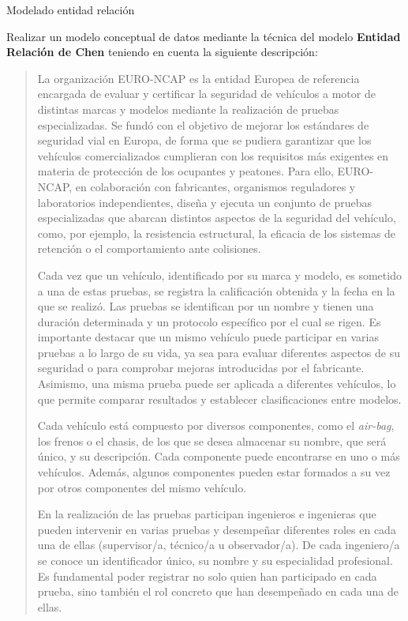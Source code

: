 \documentclass[10pt,a4paper,addpoints,answers]{exam}
\begin{document}
\begin{questions}

\question[2\half] Modelado entidad relación

Realizar un modelo conceptual de datos mediante la técnica del modelo \textbf{Entidad Relación de Chen} teniendo en cuenta la siguiente descripción:

\begin{quotation}
La organización EURO-NCAP es la entidad Europea de referencia encargada de evaluar y certificar la seguridad de vehículos a motor de distintas marcas y modelos mediante la realización de pruebas especializadas. Se fundó con el objetivo de mejorar los estándares de seguridad vial en Europa, de forma que se pudiera garantizar que los vehículos comercializados cumplieran con los requisitos más exigentes en materia de protección de los ocupantes y peatones. Para ello, EURO-NCAP, en colaboración con fabricantes, organismos reguladores y laboratorios independientes, diseña y ejecuta un conjunto de pruebas especializadas que abarcan distintos aspectos de la seguridad del vehículo, como, por ejemplo, la resistencia estructural, la eficacia de los sistemas de retención o el comportamiento ante colisiones.

Cada vez que un vehículo, identificado por su marca y modelo, es sometido a una de estas pruebas, se registra la calificación obtenida y la fecha en la que se realizó. Las pruebas se identifican por un nombre y tienen una duración determinada y un protocolo específico por el cual se rigen. Es importante destacar que un mismo vehículo puede participar en varias pruebas a lo largo de su vida, ya sea para evaluar diferentes aspectos de su seguridad o para comprobar mejoras introducidas por el fabricante. Asimismo, una misma prueba puede ser aplicada a diferentes vehículos, lo que permite comparar resultados y establecer clasificaciones entre modelos.

Cada vehículo está compuesto por diversos componentes, como el \textit{air-bag}, los frenos o el chasis, de los que se desea almacenar su nombre, que será único, y su descripción. Cada componente puede encontrarse en uno o más vehículos. Además, algunos componentes pueden estar formados a su vez por otros componentes del mismo vehículo.

En la realización de las pruebas participan ingenieros e ingenieras que pueden intervenir en varias pruebas y desempeñar diferentes roles en cada una de ellas (supervisor/a, técnico/a u observador/a). De cada ingeniero/a se conoce un identificador único, su nombre y su especialidad profesional. Es fundamental poder registrar no solo quien han participado en cada prueba, sino también el rol concreto que han desempeñado en cada una de ellas.


\end{quotation}
\end{questions}
\end{document}
